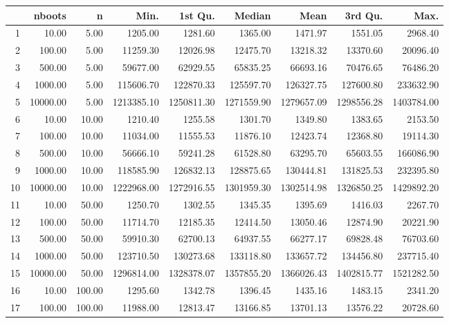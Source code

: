 \begin{table}[ht]
\centering
\begin{tabular}{rrrrrrrrr}
  \hline
 & nboots & n & Min. & 1st Qu. & Median & Mean & 3rd Qu. & Max. \\ 
  \hline
1 & 10.00 & 5.00 & 1205.00 & 1281.60 & 1365.00 & 1471.97 & 1551.05 & 2968.40 \\ 
  2 & 100.00 & 5.00 & 11259.30 & 12026.98 & 12475.70 & 13218.32 & 13370.60 & 20096.40 \\ 
  3 & 500.00 & 5.00 & 59677.00 & 62929.55 & 65835.25 & 66693.16 & 70476.65 & 76486.20 \\ 
  4 & 1000.00 & 5.00 & 115606.70 & 122870.33 & 125597.70 & 126327.75 & 127600.80 & 233632.90 \\ 
  5 & 10000.00 & 5.00 & 1213385.10 & 1250811.30 & 1271559.90 & 1279657.09 & 1298556.28 & 1403784.00 \\ 
  6 & 10.00 & 10.00 & 1210.40 & 1255.58 & 1301.70 & 1349.80 & 1383.65 & 2153.50 \\ 
  7 & 100.00 & 10.00 & 11034.00 & 11555.53 & 11876.10 & 12423.74 & 12368.80 & 19114.30 \\ 
  8 & 500.00 & 10.00 & 56666.10 & 59241.28 & 61528.80 & 63295.70 & 65603.55 & 166086.90 \\ 
  9 & 1000.00 & 10.00 & 118585.90 & 126832.13 & 128875.65 & 130444.81 & 131825.53 & 232395.80 \\ 
  10 & 10000.00 & 10.00 & 1222968.00 & 1272916.55 & 1301959.30 & 1302514.98 & 1326850.25 & 1429892.20 \\ 
  11 & 10.00 & 50.00 & 1250.70 & 1302.55 & 1345.35 & 1395.69 & 1416.03 & 2267.70 \\ 
  12 & 100.00 & 50.00 & 11714.70 & 12185.35 & 12414.50 & 13050.46 & 12874.90 & 20221.90 \\ 
  13 & 500.00 & 50.00 & 59910.30 & 62700.13 & 64937.55 & 66277.17 & 69828.48 & 76703.60 \\ 
  14 & 1000.00 & 50.00 & 123710.50 & 130273.68 & 133118.80 & 133657.72 & 134456.80 & 237715.40 \\ 
  15 & 10000.00 & 50.00 & 1296814.00 & 1328378.07 & 1357855.20 & 1366026.43 & 1402815.77 & 1521282.50 \\ 
  16 & 10.00 & 100.00 & 1295.60 & 1342.78 & 1396.45 & 1435.16 & 1483.15 & 2341.20 \\ 
  17 & 100.00 & 100.00 & 11988.00 & 12813.47 & 13166.85 & 13701.13 & 13576.22 & 20728.60 \\ 

\end{tabular}
\end{table}

